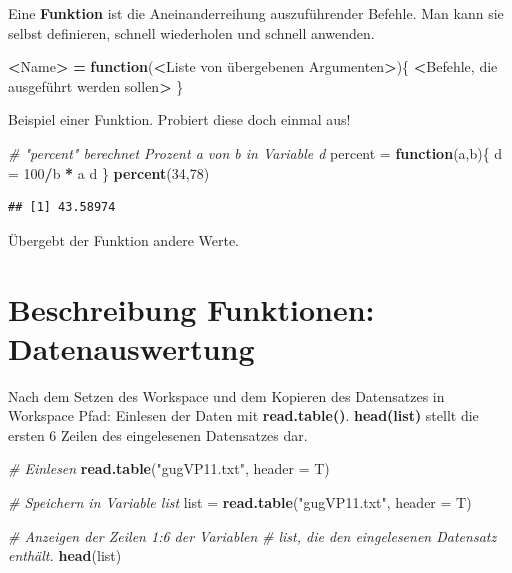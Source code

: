 \documentclass[]{book}
\newenvironment{Shaded}{\begin{snugshade}}{\end{snugshade}}
\newcommand{\KeywordTok}[1]{\textcolor[rgb]{0.13,0.29,0.53}{\textbf{#1}}}
\newcommand{\DataTypeTok}[1]{\textcolor[rgb]{0.13,0.29,0.53}{#1}}
\newcommand{\DecValTok}[1]{\textcolor[rgb]{0.00,0.00,0.81}{#1}}
\newcommand{\StringTok}[1]{\textcolor[rgb]{0.31,0.60,0.02}{#1}}
\newcommand{\CommentTok}[1]{\textcolor[rgb]{0.56,0.35,0.01}{\textit{#1}}}
\newcommand{\ControlFlowTok}[1]{\textcolor[rgb]{0.13,0.29,0.53}{\textbf{#1}}}
\newcommand{\OperatorTok}[1]{\textcolor[rgb]{0.81,0.36,0.00}{\textbf{#1}}}
\newcommand{\ErrorTok}[1]{\textcolor[rgb]{0.64,0.00,0.00}{\textbf{#1}}}
\newcommand{\NormalTok}[1]{#1}
\begin{document}
Eine \textbf{Funktion} ist die Aneinanderreihung auszuführender Befehle.
Man kann sie selbst definieren, schnell wiederholen und schnell
anwenden.

\begin{Shaded}
\begin{Highlighting}[]
\OperatorTok{<}\NormalTok{Name}\OperatorTok{>}\StringTok{ }\ErrorTok{=}\StringTok{ }\ControlFlowTok{function}\NormalTok{(}\OperatorTok{<}\NormalTok{Liste von übergebenen Argumenten}\OperatorTok{>}\NormalTok{)\{}
  \OperatorTok{<}\NormalTok{Befehle, die ausgeführt werden sollen}\OperatorTok{>}
\NormalTok{\}}
\end{Highlighting}
\end{Shaded}

Beispiel einer Funktion. Probiert diese doch einmal aus!

\begin{Shaded}
\begin{Highlighting}[]
\CommentTok{# "percent" berechnet Prozent a von b in Variable d}
\NormalTok{percent =}\StringTok{ }\ControlFlowTok{function}\NormalTok{(a,b)\{ }
\NormalTok{    d =}\StringTok{ }\DecValTok{100}\OperatorTok{/}\NormalTok{b }\OperatorTok{*}\StringTok{ }\NormalTok{a}
\NormalTok{    d}
\NormalTok{\}}
\KeywordTok{percent}\NormalTok{(}\DecValTok{34}\NormalTok{,}\DecValTok{78}\NormalTok{)}
\end{Highlighting}
\end{Shaded}

\begin{verbatim}
## [1] 43.58974
\end{verbatim}

Übergebt der Funktion andere Werte.

\chapter{Beschreibung Funktionen:
Datenauswertung}\label{beschreibung-funktionen-datenauswertung}

Nach dem Setzen des Workspace und dem Kopieren des Datensatzes in
Workspace Pfad: Einlesen der Daten mit \textbf{read.table()}.
\textbf{head(list)} stellt die ersten 6 Zeilen des eingelesenen
Datensatzes dar.

\begin{Shaded}
\begin{Highlighting}[]
\CommentTok{# Einlesen}
\KeywordTok{read.table}\NormalTok{(}\StringTok{"gugVP11.txt"}\NormalTok{, }\DataTypeTok{header =}\NormalTok{ T)}

\CommentTok{# Speichern in Variable list}
\NormalTok{list =}\StringTok{ }\KeywordTok{read.table}\NormalTok{(}\StringTok{"gugVP11.txt"}\NormalTok{, }\DataTypeTok{header =}\NormalTok{ T)}

\CommentTok{# Anzeigen der Zeilen 1:6 der Variablen }
\CommentTok{# list, die den eingelesenen Datensatz enthält.}
\KeywordTok{head}\NormalTok{(list)}
\end{Highlighting}
\end{Shaded}
\end{document}
